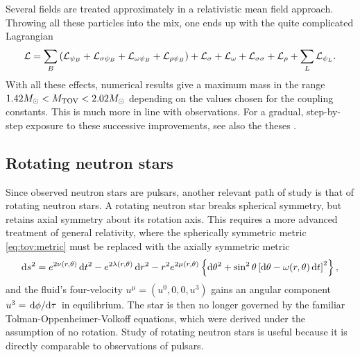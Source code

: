 Several fields are treated approximately in a relativistic mean field approach.
Throwing all these particles into the mix, one ends up with the quite complicated Lagrangian
\begin{equation*}
\begin{split}
	\mathcal{L} &= \sum_B \left( \mathcal{L}_{\psi_B} + \mathcal{L}_{\sigma \psi_{B}} + \mathcal{L}_{\omega \psi_{B}} + \mathcal{L}_{\rho \psi_{B}} \right) + \mathcal{L}_\sigma + \mathcal{L}_\omega + \mathcal{L}_{\sigma \sigma} + \mathcal{L}_\rho + \sum_L \mathcal{L}_{\psi_L} . \\
\end{split}
\end{equation*}
With all these effects, numerical results give a maximum mass in the range $1.42 M_\odot < M_\text{TOV} < 2.02 M_\odot$ depending on the values chosen for the coupling constants. \cite[table 1]{ref:neutron_star_hyperon_effect}
This is much more in line with observations.
For a gradual, step-by-step exposure to these successive improvements, see also the theses \cite{ref:master_caroline,ref:master_francesco}.

\subsection*{Rotating neutron stars}

Since observed neutron stars are pulsars, another relevant path of study is that of rotating neutron stars.
A rotating neutron star breaks spherical symmetry, but retains axial symmetry about its rotation axis.
This requires a more advanced treatment of general relativity, where the spherically symmetric metric \eqref{eq:tov:metric} must be replaced with the axially symmetric metric
\cite[section 6]{ref:glendenning}
\begin{equation*}
	\mathop{}\!\mathrm{d} s^2 = e^{2\nu(r,\theta)} \mathop{}\!\mathrm{d} t^2 - e^{2\lambda(r,\theta)} \mathop{}\!\mathrm{d} r^2 - r^2 e^{2 \mu(r,\theta)} \left\{ \mathop{}\!\mathrm{d} \theta^2 + \sin^2 \theta \left[ \mathop{}\!\mathrm{d} \theta  - \omega(r,\theta) \mathop{}\!\mathrm{d} t \right]^2 \right\} ,
\end{equation*}
and the fluid's four-velocity $u^\mu = (u^0, 0, 0, u^3)$ gains an angular component $u^3 = \odv{\phi}/{\tau}$ in equilibrium.
The star is then no longer governed by the familiar Tolman-Oppenheimer-Volkoff equations, which were derived under the assumption of no rotation.
Study of rotating neutron stars is useful because it is directly comparable to observations of pulsars.

